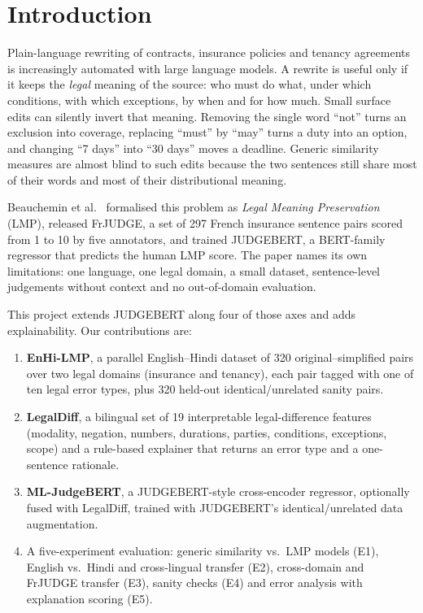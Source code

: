\section{Introduction}
Plain-language rewriting of contracts, insurance policies and tenancy agreements is increasingly automated with large language models. A rewrite is useful only if it keeps the \emph{legal} meaning of the source: who must do what, under which conditions, with which exceptions, by when and for how much. Small surface edits can silently invert that meaning. Removing the single word ``not'' turns an exclusion into coverage, replacing ``must'' by ``may'' turns a duty into an option, and changing ``7 days'' into ``30 days'' moves a deadline. Generic similarity measures are almost blind to such edits because the two sentences still share most of their words and most of their distributional meaning.

Beauchemin et al.~\cite{judgebert} formalised this problem as \emph{Legal Meaning Preservation} (LMP), released FrJUDGE, a set of 297 French insurance sentence pairs scored from 1 to 10 by five annotators, and trained JUDGEBERT, a BERT-family regressor that predicts the human LMP score. The paper names its own limitations: one language, one legal domain, a small dataset, sentence-level judgements without context and no out-of-domain evaluation.

This project extends JUDGEBERT along four of those axes and adds explainability. Our contributions are:
\begin{enumerate}
\item \textbf{EnHi-LMP}, a parallel English--Hindi dataset of 320 original--simplified pairs over two legal domains (insurance and tenancy), each pair tagged with one of ten legal error types, plus 320 held-out identical/unrelated sanity pairs.
\item \textbf{LegalDiff}, a bilingual set of 19 interpretable legal-difference features (modality, negation, numbers, durations, parties, conditions, exceptions, scope) and a rule-based explainer that returns an error type and a one-sentence rationale.
\item \textbf{ML-JudgeBERT}, a JUDGEBERT-style cross-encoder regressor, optionally fused with LegalDiff, trained with JUDGEBERT's identical/unrelated data augmentation.
\item A five-experiment evaluation: generic similarity vs.\ LMP models (E1), English vs.\ Hindi and cross-lingual transfer (E2), cross-domain and FrJUDGE transfer (E3), sanity checks (E4) and error analysis with explanation scoring (E5).
\end{enumerate}

